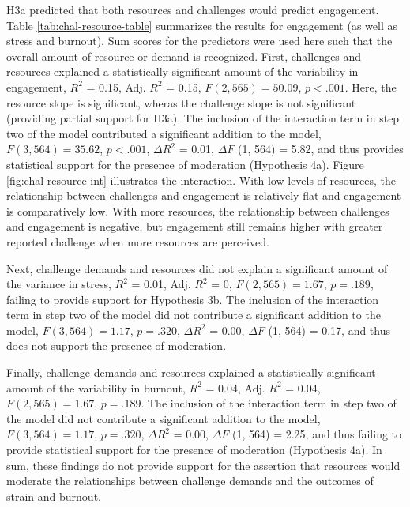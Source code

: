 \documentclass[
  man]{apa7}
\begin{document}
H3a predicted that both resources and challenges would predict engagement. Table \ref{tab:chal-resource-table} summarizes the results for engagement (as well as stress and burnout). Sum scores for the predictors were used here such that the overall amount of resource or demand is recognized. First, challenges and resources explained a statistically significant amount of the variability in engagement, \(R^2\) = 0.15, Adj. \(R^2\) = 0.15, \(F(2, 565) = 50.09\), \(p < .001\). Here, the resource slope is significant, wheras the challenge slope is not significant (providing partial support for H3a). The inclusion of the interaction term in step two of the model contributed a significant addition to the model, \(F(3, 564) = 35.62\), \(p < .001\), \(\Delta R^2\) = 0.01, \(\Delta F\) (1, 564) = 5.82, and thus provides statistical support for the presence of moderation (Hypothesis 4a). Figure \ref{fig:chal-resource-int} illustrates the interaction. With low levels of resources, the relationship between challenges and engagement is relatively flat and engagement is comparatively low. With more resources, the relationship between challenges and engagement is negative, but engagement still remains higher with greater reported challenge when more resources are perceived.

Next, challenge demands and resources did not explain a significant amount of the variance in stress, \(R^2\) = 0.01, Adj. \(R^2\) = 0, \(F(2, 565) = 1.67\), \(p = .189\), failing to provide support for Hypothesis 3b. The inclusion of the interaction term in step two of the model did not contribute a significant addition to the model, \(F(3, 564) = 1.17\), \(p = .320\), \(\Delta R^2\) = 0.00, \(\Delta F\) (1, 564) = 0.17, and thus does not support the presence of moderation.

Finally, challenge demands and resources explained a statistically significant amount of the variability in burnout, \(R^2\) = 0.04, Adj. \(R^2\) = 0.04, \(F(2, 565) = 1.67\), \(p = .189\). The inclusion of the interaction term in step two of the model did not contribute a significant addition to the model, \(F(3, 564) = 1.17\), \(p = .320\), \(\Delta R^2\) = 0.00, \(\Delta F\) (1, 564) = 2.25, and thus failing to provide statistical support for the presence of moderation (Hypothesis 4a). In sum, these findings do not provide support for the assertion that resources would moderate the relationships between challenge demands and the outcomes of strain and burnout.
\end{document}
